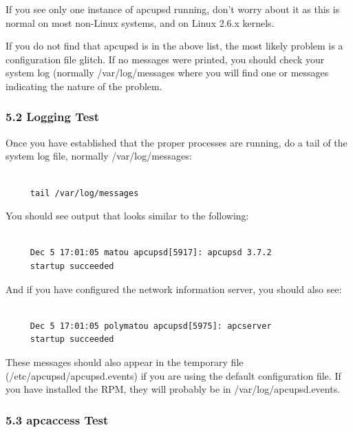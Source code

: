 If you see only one instance of apcupsd running, don't worry about it as this
is normal on most non-Linux systems, and on Linux 2.6.x kernels.  

If you do not find that apcupsd is in the above list, the most likely problem
is a configuration file glitch.  If no messages were printed, you should check
your system log (normally /var/log/messages where you will find one or
messages indicating the nature of the problem. 

\label{Logging-Test}

\subsubsection*{5.2 Logging Test}

\label{index-Testing_002c-Logging-87}
\label{index-Logging_002c-Testing-88}
Once you have established that the proper processes are running, do a tail of
the system log file, normally /var/log/messages: 

\footnotesize
\begin{verbatim}
     
     tail /var/log/messages
\end{verbatim}
\normalsize

You should see output that looks similar to the following: 

\footnotesize
\begin{verbatim}
     
     Dec 5 17:01:05 matou apcupsd[5917]: apcupsd 3.7.2
     startup succeeded
\end{verbatim}
\normalsize

And if you have configured the network information server, you should also
see: 

\footnotesize
\begin{verbatim}
     
     Dec 5 17:01:05 polymatou apcupsd[5975]: apcserver
     startup succeeded
\end{verbatim}
\normalsize

These messages should also appear in the temporary file
(/etc/apcupsd/apcupsd.events) if you are using the default configuration file.
If you have installed the RPM, they will probably be in
/var/log/apcupsd.events. 

\label{apcaccess-Test}

\subsubsection*{5.3 apcaccess Test}

